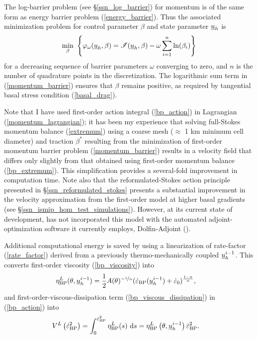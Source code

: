 The log-barrier problem  (see \S \ref{ssn_log_barrier}) for momentum is of the same form as energy barrier problem (\ref{energy_barrier}).  Thus the associated minimization problem for  control parameter $\beta$ and  state parameter $\underline{u}_h$ is
\begin{align}
  \min_{\beta}\ \left\{ \varphi_{\omega}(\underline{u}_h, \beta) = \mathscr{I}(\underline{u}_h, \beta) - \omega \sum_{i=1}^n \ln(\beta_i) \right\}
\label{momentum_barrier}
\end{align}
for a decreasing sequence of barrier parameters $\omega$ converging to zero, and $n$ is the number of quadrature points in the discretization.  The logarithmic sum term in (\ref{momentum_barrier}) ensures that $\beta$ remains positive, as required by tangential basal stress condition (\ref{basal_drag}).
  
Note that I have used first-order action integral (\ref{bp_action}) in Lagrangian (\ref{momentum_lagrangian}); it has been my experience that solving full-Stokes momentum balance (\ref{extremum}) using a coarse mesh ($\approx$ 1 km minimum cell diameter) and traction $\beta^*$ resulting from the minimization of first-order momentum barrier problem (\ref{momentum_barrier}) results in a velocity field that differs only slightly from that obtained using first-order momentum balance (\ref{bp_extremum}).  This simplification provides a several-fold improvement in computation time.  Note also that the reformulated-Stokes action principle presented in \S \ref{ssn_reformulated_stokes} presents a substantial improvement in the velocity approximation from the first-order model at higher basal gradients (see \S \ref{ssn_ismip_hom_test_simulations}).  However, at its current state of development, \CSLVR has not incorporated this model with the automated adjoint-optimization software it currently employs, Dolfin-Adjoint (\citet{farrell_2013}).
  
Additional computational energy is saved by using a linearization of rate-factor (\ref{rate_factor}) derived from a previously thermo-mechanically coupled $\underline{u}_h^{i-1}$.  This converts first-order viscosity (\ref{bp_viscosity}) into
\begin{align}
  \label{linear_bp_viscosity}
  \eta_{\text{BP}}^L(\theta, \underline{u}_h^{i-1}) &= \frac{1}{2}A(\theta)^{-\nicefrac{1}{n}} (\dot{\varepsilon}_{\text{BP}}(\underline{u}_h^{i-1}) + \dot{\varepsilon}_0)^{\frac{1-n}{n}},
\end{align} 
and first-order-viscous-dissipation term (\ref{bp_viscous_dissipation}) in (\ref{bp_action}) into 
\begin{align}
  \label{linear_viscous_dissipation}
  V^L\left( \dot{\varepsilon}_{\text{BP}}^2 \right) &= \int_0^{\dot{\varepsilon}_{\text{BP}}^2} \eta_{\text{BP}}^L(s) \ \mathrm{d}s = \eta_{\text{BP}}^L\left(\theta, \underline{u}_h^{i-1} \right) \dot{\varepsilon}_{\text{BP}}^2.
\end{align}
  
